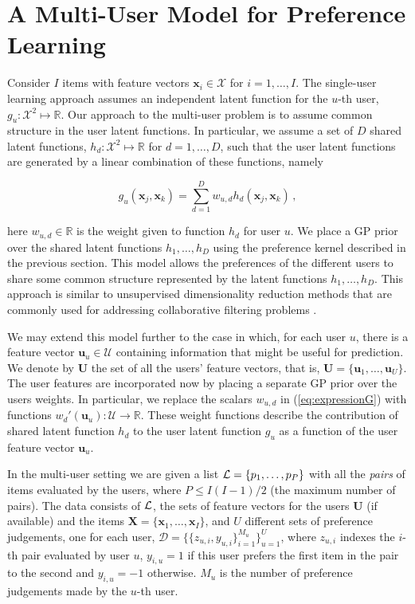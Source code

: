\section{A Multi-User Model for Preference Learning \label{sec:model}}

Consider $I$ items with feature vectors $\mathbf{x}_i\in\mathcal{X}$ for $i=1,\ldots,I$. 
The single-user learning approach assumes an independent latent function for the $u$-th user,
$g_u:\mathcal{X}^2\mapsto\mathbb{R}$. Our approach to the multi-user problem is to assume common structure
in the user latent functions. In particular, we assume a set of $D$ shared latent functions,
$h_d:\mathcal{X}^2\mapsto \mathbb{R}$ for $d=1,\ldots,D$, such that the user latent functions are 
generated by a linear combination of these functions, namely

\begin{equation}
g_{u}(\mathbf{x}_j,\mathbf{x}_k)=\sum_{d=1}^{D}w_{u,d}h_{d}(\mathbf{x}_j,\mathbf{x}_k)\,,\label{eq:expressionG}
\end{equation}

here $w_{u,d}\in \mathbb{R}$ is the weight given to function $h_d$ for user $u$.
We place a GP prior over the shared latent functions $h_{1},\ldots,h_{D}$ using the
preference kernel described in the previous section.
This model allows the preferences of the different users to share
some common structure represented by the latent functions $h_{1},\ldots,h_{D}$.
This approach is similar to unsupervised dimensionality reduction methods that are commonly used for addressing collaborative filtering problems \cite{stern2009,raiko2007}.

We may extend this model further to the case in which, for each user $u$, there is
a feature vector $\mathbf{u}_u \in \mathcal{U}$ containing information that might be useful for prediction.
We denote by $\mathbf{U}$ the set of all the users' feature vectors,
that is, $\mathbf{U} = \{\mathbf{u}_1,\ldots,\mathbf{u}_U\}$.
The user features are incorporated now by placing a separate GP prior over the users weights.
In particular, we replace the scalars $w_{u,d}$ in (\ref{eq:expressionG}) with functions
$w_d'(\mathbf{u}_u):\mathcal{U}\rightarrow\mathcal{\mathbb{R}}$. 
These weight functions describe the contribution of shared latent function
$h_d$ to the user latent function $g_u$ as a function of the user feature vector $\mathbf{u}_u$.

In the multi-user setting we are given a list
$\mathcal{L}=\{p_1,\ldots,p_P\}$ with all the \emph{pairs} of items evaluated by the users, where $P\leq I(I-1)/2$ (the maximum number of pairs).
The data consists of $\mathcal{L}$, the sets of feature vectors for the users $\mathbf{U}$ (if available)
and the items $\mathbf{X}=\{\mathbf{x}_1,\ldots,\mathbf{x}_I\}$, and $U$ different sets of preference judgements,
one for each user, $\mathcal{D}=\{\{z_{u,i},y_{u,i}\}_{i=1}^{M_u}\}_{u=1}^{U}$, where $z_{u,i}$ indexes the $i$-th
pair evaluated by user $u$, $y_{i,u}=1$ if this user
prefers the first item in the pair to the second and $y_{i,u}=-1$ otherwise. $M_u$ is the number of 
preference judgements made by the $u$-th user.


